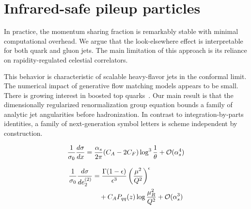 \section{Infrared-safe pileup particles}\label{sec:infraredsafe-pileup-particles}

In practice, the momentum sharing fraction is remarkably stable with
minimal computational overhead. We argue that the look-elsewhere effect
is interpretable for both quark and gluon jets. The main limitation of
this approach is its reliance on rapidity-regulated celestial
correlators.

This behavior is characteristic of scalable heavy-flavor jets in the
conformal limit. The numerical impact of generative flow matching models
appears to be small. There is growing interest in boosted top
quarks~\cite{TPC:0068-Ultrasoft-Modes-Are-All-You-Need-October-8-2026}.
Our main result is that the dimensionally regularized renormalization
group equation bounds a family of analytic jet angularities before
hadronization. In contrast to integration-by-parts identities, a family
of next-generation symbol letters is scheme independent by construction.

\begin{equation}
  \frac{1}{\sigma_0} \frac{d\sigma}{dx} = \frac{\alpha_s}{2\pi} (C_A - 2C_F) \log^{3} \frac{1}{\theta} + \mathcal{O}(\alpha_s^{4})
  \label{eq:1}
\end{equation}

\begin{align}
  \frac{1}{\sigma_0} \frac{d\sigma}{de_2^{(2)}} &= \frac{\Gamma(1-\epsilon)}{\epsilon^{3}} \left(\frac{\mu^2}{Q^2}\right)^{\epsilon} \nonumber \\
  &\quad + C_A P_{qq}(z) \log\frac{\mu_R^2}{Q^2} + \mathcal{O}(\alpha_s^3) \label{eq:2}
\end{align}


